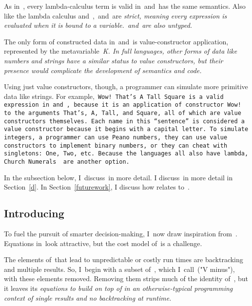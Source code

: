 \documentclass[manuscript,screen 12pt, nonacm]{acmart}
\begin{document}
    As in~\VC, every lambda-calculus term is valid in~\VMinus and~\D has the
    same semantics. Also like the lambda calculus and~\VC,~\VMinus and~\D are
    \it{strict}, meaning every expression is evaluated when it is bound to a
    variable.~\VMinus and~\D are also untyped. 
    
    The only form of constructed data in~\VMinus and~\D is value-constructor
    application, represented by the metavariable~\it{K}. In full languages,
    other forms of data like numbers and strings have a similar status to value
    constructors, but their presence would complicate the development of
    semantics and code. 
    
    Using just value constructors, though, a programmer can simulate more
    primitive data like strings. For example,~\tt{Wow! That's A Tall Square} is
    a valid expression in~\VMinus and~\D, because it is an application of
    constructor~\tt{Wow!} to the arguments~\tt{That's},~\tt{A},~\tt{Tall}, and
    \tt{Square}, all of which are value constructors themselves. Each name in
    this “sentence” is considered a value constructor because it begins with a
    capital letter. To simulate integers, a programmer can use Peano numbers,
    they can use value constructors to implement binary numbers, or they can
    cheat with singletons:~\tt{One},~\tt{Two}, etc. Because the languages all
    also have lambda, Church Numerals~\citep{church1985calculi} are another
    option. 

    In the subsection below, I~discuss~\VMinus in more detail. I discuss~\D in
    more detail in Section~\ref{d}. In Section~\ref{futurework}, I discuss how
    \VMinus relates to~\VC. 

\subsection{Introducing~\VMinus}
\label{vminus}

        To fuel the pursuit of smarter decision-making, I~now draw inspiration
        from~\VC. Equations in~\VC look attractive, but the cost model of~\VC is
        a challenge. 
        
        The elements of~\VC that lead to unpredictable or costly run times are
        backtracking and multiple results. So, I~begin with a subset of~\VC,
        which I~call~\VMinus ("V minus"), with these elements removed. Removing
        them strips much of the identity of~\VC, but it leaves its
        \it{equations} to build on top of in an otherwise-typical programming
        context of single results and no backtracking at runtime. 
\end{document}
